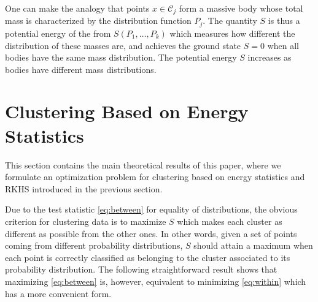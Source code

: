 \documentclass[aps,preprint,nofootinbib,floatfix]{revtex4-1}
\newcommand\C{{\mathcal{C}}}
\begin{document}
One can make the analogy 
that points $ x \in \C_j$ form a massive body 
whose total mass is characterized by the distribution function $P_j$.
The quantity $S$ is thus a potential
energy of the from $S(P_1,\dotsc,P_k)$ which measures how different
the distribution of these masses are,  and achieves the ground state
$S=0$ when all bodies have the same mass distribution. The potential energy
$S$ increases as bodies have different mass distributions.


\section{Clustering Based on Energy Statistics}
\label{sec:clustering_theory}

This section contains the main theoretical results of this paper, where 
we formulate an optimization problem for clustering 
based on energy statistics and RKHS introduced in the previous section.

Due to the test statistic \eqref{eq:between} for equality of distributions,
the obvious
criterion for clustering data is to 
maximize $S$ which makes 
each cluster as different
as possible from the other ones.
In other words, given a set of points coming from different probability
distributions, $S$ should attain a maximum when each point is correctly
classified as belonging to the cluster associated to its probability
distribution.
The following 
straightforward result
shows that maximizing \eqref{eq:between} is, however, equivalent to minimizing
\eqref{eq:within} which has a more convenient form.
\end{document}
